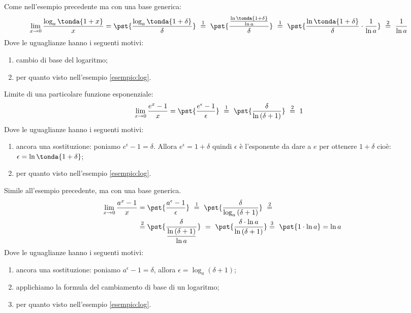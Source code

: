 \begin{esempio}
Come nell'esempio precedente ma con una base generica:
\begin{align*}
 \lim_{x \rightarrow 0} \dfrac{\log_a\tonda{1+x}}{x} &=
 \pst{\dfrac{\log_a\tonda{1+\delta}}{\delta}}~\stackrel{1}{=} ~  
 \pst{\dfrac{\frac{\ln\tonda{1+\delta}}{\ln a}}{\delta}}~\stackrel{1}{=} ~
 \pst{\dfrac{\ln\tonda{1+\delta}}{\delta}\cdot \dfrac{1}{\ln a}}
 ~ \stackrel{2}{=} ~
 \dfrac{1}{\ln a}
\end{align*}
Dove le uguaglianze hanno i seguenti motivi:
\begin{enumerate} [nosep]
 \item cambio di base del logaritmo;
 \item per quanto visto nell'esempio \ref{esempio:log}.
\end{enumerate}
\end{esempio}

\begin{esempio}
Limite di una particolare funzione esponenziale:
\begin{align*}
\lim_{x \rightarrow 0} \dfrac{e^x-1}{x} &=
\pst{\dfrac{e^\epsilon-1}{\epsilon}}
~ \stackrel{1}{=} ~  
\pst{\dfrac{\delta}{\ln{(\delta+1)}}}~ \stackrel{2}{=} ~ 1
\end{align*}
Dove le uguaglianze hanno i seguenti motivi:
\begin{enumerate} [nosep]
 \item ancora una sostituzione: poniamo \(e^\epsilon-1=\delta\). 
Allora \(e^\epsilon = 1+\delta\) quindi \(\epsilon\) è l'esponente da dare 
a \(e\) per ottenere \(1+\delta\) cioè: 
\(\epsilon = \ln{\tonda{1+\delta}}\);
 \item per quanto visto nell'esempio \ref{esempio:log}.
\end{enumerate}
\end{esempio}

\begin{esempio}
Simile all'esempio precedente, ma con una base generica.
\begin{align*}
\lim_{x \rightarrow 0} \dfrac{a^x-1}{x} &=
\pst{\dfrac{a^\epsilon-1}{\epsilon}}
~ \stackrel{1}{=} ~  
\pst{\dfrac{\delta}{\log_a{(\delta+1)}}}~ \stackrel{2}{=}\\
&\stackrel{2}{=} 
\pst{\frac{\delta}{\dfrac{\ln{(\delta+1)}}{\ln a}}} ~=~
\pst{\frac{\delta \cdot \ln a}{\ln{(\delta+1)}}} %
\stackrel{3}{=} ~ 
\pst{1 \cdot \ln a}=\ln{a}
\end{align*}
Dove le uguaglianze hanno i seguenti motivi:
\begin{enumerate} [nosep]
 \item ancora una sostituzione: poniamo
\(a^\epsilon-1=\delta\), allora \(\epsilon=\log_a(\delta+1)\);
 \item applichiamo la formula del cambiamento di base di un logaritmo; 
 \item per quanto visto nell'esempio \ref{esempio:log}.
\end{enumerate}
\end{esempio}

